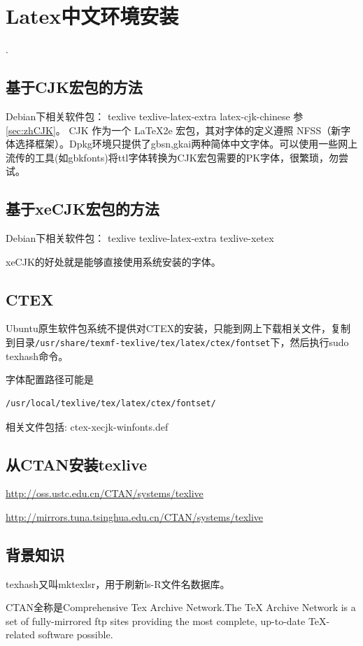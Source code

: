 
\section{Latex中文环境安装}
\label{sec:LatexInstall}.
\subsection{基于CJK宏包的方法}
Debian下相关软件包：
texlive texlive-latex-extra latex-cjk-chinese
参\ref{sec:zhCJK}。
CJK 作为一个 LaTeX2e 宏包，其对字体的定义遵照 NFSS（新字体选择框架）。Dpkg环境只提供了gbsn,gkai两种简体中文字体。可以使用一些网上流传的工具(如gbkfonts)将ttl字体转换为CJK宏包需要的PK字体，很繁琐，勿尝试。

\subsection{基于xeCJK宏包的方法}
Debian下相关软件包：
texlive texlive-latex-extra texlive-xetex

xeCJK的好处就是能够直接使用系统安装的字体。

\subsection{CTEX}
Ubuntu原生软件包系统不提供对CTEX的安装，只能到网上下载相关文件，复制到目录\verb+/usr/share/texmf-texlive/tex/latex/ctex/fontset+下，然后执行sudo texhash命令。

字体配置路径可能是
\begin{verbatim}
/usr/local/texlive/tex/latex/ctex/fontset/
\end{verbatim}
相关文件包括: ctex-xecjk-winfonts.def

\subsection{从CTAN安装texlive}
\url{http://oss.ustc.edu.cn/CTAN/systems/texlive}

\url{http://mirrors.tuna.tsinghua.edu.cn/CTAN/systems/texlive}

\subsection{背景知识}
texhash又叫mktexlsr，用于刷新ls-R文件名数据库。

CTAN全称是Comprehensive Tex Archive Network.The TeX Archive Network is a set of fully-mirrored ftp sites providing the most complete, up-to-date TeX-related software possible.





